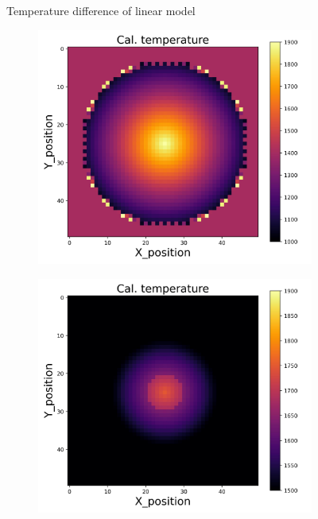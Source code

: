 {\begin{figure}[h]
\begin{minipage}{\textwidth}
\begin{subfigure}{0.28\textwidth}
        \end{subfigure}
    \end{minipage}
    \caption{Temperature difference of linear model}  
\end{figure}
\begin{figure}[p]
    \centering
    \begin{minipage}{\textwidth}
        \centering
        \begin{subfigure}{0.325\textwidth}
            \centering
            \includegraphics[width=\textwidth]{figures/raw_data/0/linear/T_cal.jpg}
        \end{subfigure}
        \begin{subfigure}{0.325\textwidth}
            \centering
            \includegraphics[width=\textwidth]{figures/raw_data/5/linear/T_cal.jpg}

\end{subfigure}
\end{minipage}
\end{figure}}

